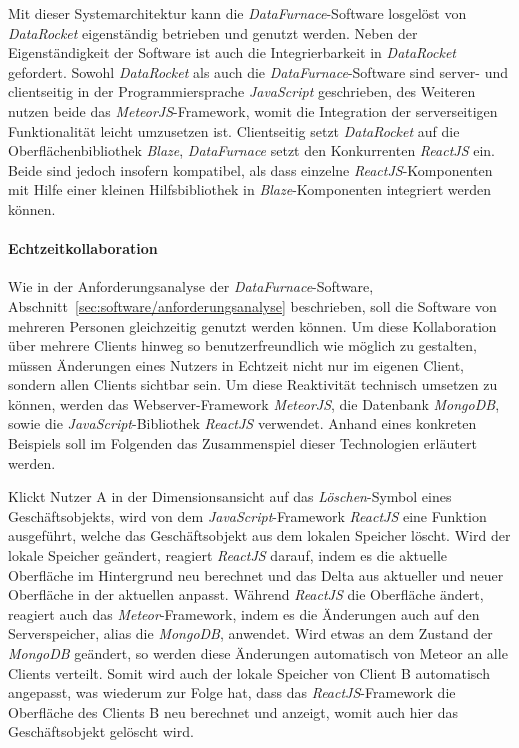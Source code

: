\documentclass[
  language=german, %
  type=bachelor,%
  ngerman
]{isthesis}
\begin{document}
\begin{content}
  Mit dieser Systemarchitektur kann die \textit{DataFurnace}-Software losgelöst
  von \textit{DataRocket} eigenständig betrieben und genutzt werden. Neben der
  Eigenständigkeit der Software ist auch die Integrierbarkeit in
  \textit{DataRocket} gefordert. Sowohl \textit{DataRocket} als auch die
  \textit{DataFurnace}-Software sind server- und clientseitig in der
  Programmiersprache \textit{JavaScript} geschrieben, des Weiteren nutzen beide
  das \textit{MeteorJS}-Framework, womit die Integration der serverseitigen
  Funktionalität leicht umzusetzen ist. Clientseitig setzt \textit{DataRocket}
  auf die Oberflächenbibliothek \textit{Blaze}, \textit{DataFurnace} setzt den
  Konkurrenten \textit{ReactJS} ein. Beide sind jedoch insofern kompatibel, als
  dass einzelne \textit{ReactJS}-Komponenten mit Hilfe einer kleinen
  Hilfsbibliothek in \textit{Blaze}-Komponenten integriert werden können.




  \paragraph{Echtzeitkollaboration}

  Wie in der Anforderungsanalyse der \textit{DataFurnace}-Software,
  Abschnitt~\ref{sec:software/anforderungsanalyse} beschrieben, soll die
  Software von mehreren Personen gleichzeitig genutzt werden können. Um diese
  Kollaboration über mehrere Clients hinweg so benutzerfreundlich wie möglich
  zu gestalten, müssen Änderungen eines Nutzers in Echtzeit nicht nur im
  eigenen Client, sondern allen Clients sichtbar sein. Um diese Reaktivität
  technisch umsetzen zu können, werden das Webserver-Framework \textit{MeteorJS},
  die Datenbank \textit{MongoDB}, sowie die \textit{JavaScript}-Bibliothek
  \textit{ReactJS} verwendet. Anhand eines konkreten Beispiels soll im
  Folgenden das Zusammenspiel dieser Technologien erläutert werden. 
  
  Klickt Nutzer A in der Dimensionsansicht auf das \textit{Löschen}-Symbol
  eines Geschäftsobjekts, wird von dem \textit{JavaScript}-Framework
  \textit{ReactJS} eine Funktion ausgeführt, welche das Geschäftsobjekt aus dem
  lokalen Speicher löscht. Wird der lokale Speicher geändert, reagiert
  \textit{ReactJS} darauf, indem es die aktuelle Oberfläche im Hintergrund neu
  berechnet und das Delta aus aktueller und neuer Oberfläche in der aktuellen
  anpasst. Während \textit{ReactJS} die Oberfläche ändert, reagiert auch das
  \textit{Meteor}-Framework, indem es die Änderungen auch auf den
  Serverspeicher, alias die \textit{MongoDB}, anwendet. Wird etwas an dem
  Zustand der \textit{MongoDB} geändert, so werden diese Änderungen automatisch
  von Meteor an alle Clients verteilt. Somit wird auch der lokale Speicher von
  Client B automatisch angepasst, was wiederum zur Folge hat, dass das
  \textit{ReactJS}-Framework die Oberfläche des Clients B neu berechnet und
  anzeigt, womit auch hier das Geschäftsobjekt gelöscht wird.


\end{content}
\end{document}
